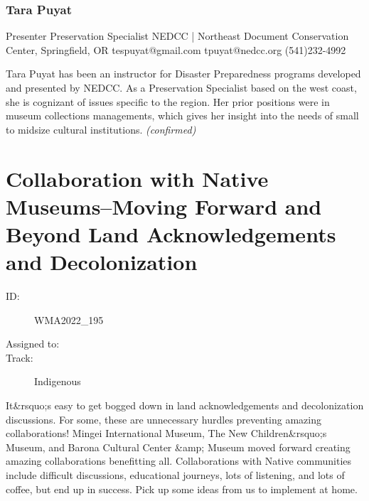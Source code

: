\documentclass{report}
\begin{document}
              

              
                \subsubsection*{ Tara Puyat }
                Presenter\newline
                Preservation Specialist\newline
                NEDCC | Northeast Document Conservation Center, Springfield, OR
                \newline
                tespuyat@gmail.com\newline
                tpuyat@nedcc.org\newline
                (541)232-4992\newline

                Tara Puyat has been an instructor for Disaster Preparedness programs developed and presented by NEDCC. As a Preservation Specialist based on the west coast, she is cognizant of issues specific to the region. Her prior positions were in museum collections managements, which gives her insight into the needs of small to midsize cultural institutions.
                \emph{ (confirmed) }
              

              

              

              
        
          \newpage
          \section{ Collaboration with Native Museums--Moving Forward and Beyond Land Acknowledgements and Decolonization  }
            \begin{description}
              \item [ID:]
              WMA2022\_195

              \item [Assigned to:]
                \item [Track:]Indigenous~
              \end{description}

              It\&rsquo;s easy to get bogged down in land acknowledgements and decolonization discussions.  For some, these are unnecessary hurdles preventing amazing collaborations!  Mingei International Museum, The New Children\&rsquo;s Museum, and Barona Cultural Center \&amp; Museum moved forward creating amazing collaborations benefitting all.  Collaborations with Native communities include difficult discussions, educational journeys, lots of listening, and lots of coffee, but end up in success.  Pick up some ideas from us to implement at home.
\end{document}
